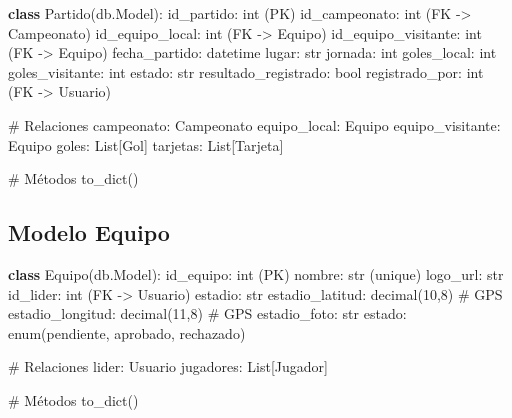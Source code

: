 \documentclass[
  spanish,
  11pt,
  letterpaper,
]{book}
\newenvironment{Shaded}{\begin{snugshade}}{\end{snugshade}}
\newcommand{\BuiltInTok}[1]{\textcolor[rgb]{0.00,0.23,0.31}{#1}}
\newcommand{\CommentTok}[1]{\textcolor[rgb]{0.37,0.37,0.37}{#1}}
\newcommand{\DecValTok}[1]{\textcolor[rgb]{0.68,0.00,0.00}{#1}}
\newcommand{\KeywordTok}[1]{\textcolor[rgb]{0.00,0.23,0.31}{\textbf{#1}}}
\newcommand{\NormalTok}[1]{\textcolor[rgb]{0.00,0.23,0.31}{#1}}
\newcommand{\OperatorTok}[1]{\textcolor[rgb]{0.37,0.37,0.37}{#1}}
\newcommand{\StringTok}[1]{\textcolor[rgb]{0.13,0.47,0.30}{#1}}
\begin{document}
\begin{Shaded}
\begin{Highlighting}[]
\KeywordTok{class}\NormalTok{ Partido(db.Model):}
\NormalTok{    id\_partido: }\BuiltInTok{int}\NormalTok{ (PK)}
\NormalTok{    id\_campeonato: }\BuiltInTok{int}\NormalTok{ (FK }\OperatorTok{{-}\textgreater{}}\NormalTok{ Campeonato)}
\NormalTok{    id\_equipo\_local: }\BuiltInTok{int}\NormalTok{ (FK }\OperatorTok{{-}\textgreater{}}\NormalTok{ Equipo)}
\NormalTok{    id\_equipo\_visitante: }\BuiltInTok{int}\NormalTok{ (FK }\OperatorTok{{-}\textgreater{}}\NormalTok{ Equipo)}
\NormalTok{    fecha\_partido: datetime}
\NormalTok{    lugar: }\BuiltInTok{str}
\NormalTok{    jornada: }\BuiltInTok{int}
\NormalTok{    goles\_local: }\BuiltInTok{int}
\NormalTok{    goles\_visitante: }\BuiltInTok{int}
\NormalTok{    estado: }\BuiltInTok{str}
\NormalTok{    resultado\_registrado: }\BuiltInTok{bool}
\NormalTok{    registrado\_por: }\BuiltInTok{int}\NormalTok{ (FK }\OperatorTok{{-}\textgreater{}}\NormalTok{ Usuario)}
    
    \CommentTok{\# Relaciones}
\NormalTok{    campeonato: Campeonato}
\NormalTok{    equipo\_local: Equipo}
\NormalTok{    equipo\_visitante: Equipo}
\NormalTok{    goles: List[Gol]}
\NormalTok{    tarjetas: List[Tarjeta]}
    
    \CommentTok{\# Métodos}
\NormalTok{    to\_dict()}
\end{Highlighting}
\end{Shaded}

\subsection{Modelo Equipo}\label{modelo-equipo}

\begin{Shaded}
\begin{Highlighting}[]
\KeywordTok{class}\NormalTok{ Equipo(db.Model):}
\NormalTok{    id\_equipo: }\BuiltInTok{int}\NormalTok{ (PK)}
\NormalTok{    nombre: }\BuiltInTok{str}\NormalTok{ (unique)}
\NormalTok{    logo\_url: }\BuiltInTok{str}
\NormalTok{    id\_lider: }\BuiltInTok{int}\NormalTok{ (FK }\OperatorTok{{-}\textgreater{}}\NormalTok{ Usuario)}
\NormalTok{    estadio: }\BuiltInTok{str}
\NormalTok{    estadio\_latitud: decimal(}\DecValTok{10}\NormalTok{,}\DecValTok{8}\NormalTok{)  }\CommentTok{\# GPS}
\NormalTok{    estadio\_longitud: decimal(}\DecValTok{11}\NormalTok{,}\DecValTok{8}\NormalTok{)  }\CommentTok{\# GPS}
\NormalTok{    estadio\_foto: }\BuiltInTok{str}
\NormalTok{    estado: enum(}\StringTok{\textquotesingle{}pendiente\textquotesingle{}}\NormalTok{, }\StringTok{\textquotesingle{}aprobado\textquotesingle{}}\NormalTok{, }\StringTok{\textquotesingle{}rechazado\textquotesingle{}}\NormalTok{)}
    
    \CommentTok{\# Relaciones}
\NormalTok{    lider: Usuario}
\NormalTok{    jugadores: List[Jugador]}
    
    \CommentTok{\# Métodos}
\NormalTok{    to\_dict()}
\end{Highlighting}
\end{Shaded}
\end{document}
